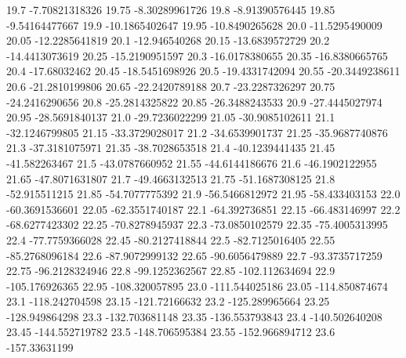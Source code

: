            19.7   -7.70821318326
          19.75   -8.30289961726
           19.8   -8.91390576445
          19.85   -9.54164477667
           19.9   -10.1865402647
          19.95   -10.8490265628
           20.0   -11.5295490009
          20.05   -12.2285641819
           20.1    -12.946540268
          20.15   -13.6839572729
           20.2   -14.4413073619
          20.25   -15.2190951597
           20.3   -16.0178380655
          20.35   -16.8380665765
           20.4     -17.68032462
          20.45   -18.5451698926
           20.5   -19.4331742094
          20.55   -20.3449238611
           20.6   -21.2810199806
          20.65   -22.2420789188
           20.7   -23.2287326297
          20.75   -24.2416290656
           20.8   -25.2814325822
          20.85   -26.3488243533
           20.9   -27.4445027974
          20.95   -28.5691840137
           21.0   -29.7236022299
          21.05   -30.9085102611
           21.1   -32.1246799805
          21.15   -33.3729028017
           21.2   -34.6539901737
          21.25   -35.9687740876
           21.3   -37.3181075971
          21.35   -38.7028653518
           21.4   -40.1239441435
          21.45    -41.582263467
           21.5   -43.0787660952
          21.55   -44.6144186676
           21.6   -46.1902122955
          21.65   -47.8071631807
           21.7   -49.4663132513
          21.75   -51.1687308125
           21.8    -52.915511215
          21.85   -54.7077775392
           21.9   -56.5466812972
          21.95    -58.433403153
           22.0   -60.3691536601
          22.05   -62.3551740187
           22.1    -64.392736851
          22.15    -66.483146997
           22.2   -68.6277423302
          22.25   -70.8278945937
           22.3   -73.0850102579
          22.35   -75.4005313995
           22.4   -77.7759366028
          22.45   -80.2127418844
           22.5   -82.7125016405
          22.55   -85.2768096184
           22.6   -87.9072999132
          22.65   -90.6056479889
           22.7   -93.3735717259
          22.75   -96.2128324946
           22.8   -99.1252362567
          22.85   -102.112634694
           22.9   -105.176926365
          22.95   -108.320057895
           23.0   -111.544025186
          23.05   -114.850874674
           23.1   -118.242704598
          23.15    -121.72166632
           23.2   -125.289965664
          23.25   -128.949864298
           23.3   -132.703681148
          23.35   -136.553793843
           23.4   -140.502640208
          23.45   -144.552719782
           23.5   -148.706595384
          23.55   -152.966894712
           23.6    -157.33631199
